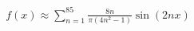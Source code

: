 \documentclass[preview]{standalone}
\begin{document}
\begin{align*}
f(x) \approx \sum_{n=1}^{85} \frac{8n}{\pi(4n^2-1)} \sin(2nx)
\end{align*}
\end{document}
